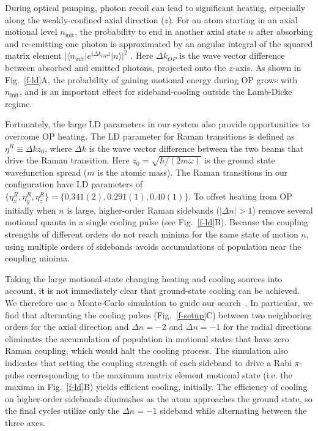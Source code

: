 \documentclass[aps,prl,twocolumn,groupedaddress]{revtex4-1}
\begin{document}
During optical pumping, photon recoil can lead to significant heating, especially along the weakly-confined axial direction ($z$).  For an atom starting in an axial motional level $n_{\textrm{init}}$, the probability to end in another axial state $n$ after absorbing and re-emitting one photon is approximated by an angular integral of the squared matrix element $|\langle n_{\textrm{init}}|e^{i \Delta k_{OP} z}| n\rangle|^2$ \cite{ItanoWineland1979}. Here $\Delta k_{OP}$ is the wave vector difference between absorbed and emitted photons, projected onto the $z$-axis.  As shown in Fig.~\ref{f-ld}A, the probability of gaining motional energy during OP grows with $n_{\textrm{init}}$, and is an important effect for sideband-cooling outside the Lamb-Dicke regime.

Fortunately, the large LD parameters in our system also provide opportunities to overcome OP heating.
The LD parameter for Raman transitions is defined as $\eta^R\equiv\Delta k z_0$,
where $\Delta k$ is the wave vector difference
between the two beams that drive the Raman transition.  Here $z_0=\sqrt{\hbar/(2 m \omega)}$ is the ground state wavefunction spread ($m$ is the atomic mass).
The Raman transitions in our configuration have LD parameters of
$\{\eta^R_x,\eta^R_y,\eta^R_z\} = \{0.341(2), 0.291(1), 0.40(1)\}$.
To offset heating from OP initially when $n$ is large, higher-order Raman sidebands ($|\Delta n| > 1$)   remove several motional quanta in a single cooling pulse (see Fig.~\ref{f-ld}B).
Because the coupling strengths of different orders do not reach minima for the same state of motion $n$,
using multiple orders of sidebands avoids accumulations of population
near the coupling minima.

Taking the large motional-state changing heating and cooling sources
 into account,
it is not immediately clear that ground-state cooling can be achieved.
We therefore use a Monte-Carlo simulation to guide our search~\cite{Dalibard1992}.
In particular, we find that alternating the cooling pulses (Fig.~\ref{f-setup}C) between two
neighboring orders for the axial direction and $\Delta n=-2$ and $\Delta n=-1$ for the radial directions
eliminates the accumulation of population in motional states that have zero Raman coupling, which would halt the cooling process.
The simulation also indicates that setting the coupling strength of each sideband
to drive a Rabi $\pi$-pulse corresponding to the maximum matrix element motional state
(i.e. the maxima in Fig.~\ref{f-ld}B)  yields efficient cooling, initially.
The efficiency of cooling on higher-order sidebands diminishes
as the atom approaches the ground state, so the final cycles utilize only the $\Delta n=-1$ sideband while alternating between the three axes.
\end{document}
